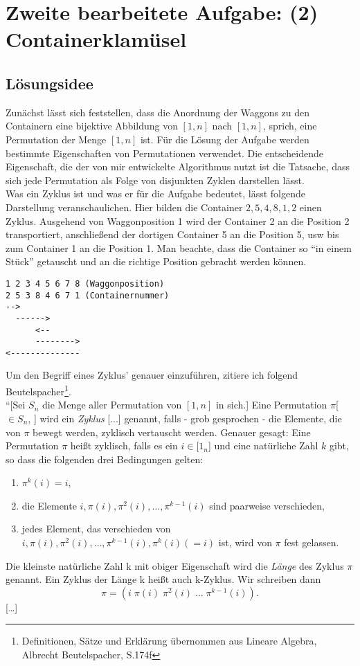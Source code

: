 \lstset{language=Scala}
\chapter{Zweite bearbeitete Aufgabe: (2) Containerklamüsel}
\minitoc
\clearpage
\section{Lösungsidee}
Zunächst lässt sich feststellen,
dass die Anordnung der Waggons zu den Containern eine bijektive Abbildung von $[1,n]$ nach $[1,n]$, sprich, eine Permutation der Menge $[1,n]$ ist.
Für die Lösung der Aufgabe werden bestimmte Eigenschaften von Permutationen verwendet. 
Die entscheidende Eigenschaft, die der von mir entwickelte Algorithmus nutzt ist die Tatsache,
dass sich jede Permutation als Folge von disjunkten Zyklen darstellen lässt.\\

Was ein Zyklus ist und was er für die Aufgabe bedeutet, lässt folgende Darstellung veranschaulichen.
Hier bilden die Container $2,5,4,8,1,2$ einen Zyklus. Ausgehend von Waggonposition 1 wird der Container 2 an die Position 2 transportiert,
anschließend der dortigen Container 5 an die Position 5, usw bis zum Container 1 an die Position 1.
Man beachte, dass die Container so ``in einem Stück'' getauscht und an die richtige Position gebracht werden können.
\lstset{basicstyle=\ttfamily}
\begin{lstlisting}
1 2 3 4 5 6 7 8 (Waggonposition)
2 5 3 8 4 6 7 1 (Containernummer)
-->
  ------>
      <--
      -------->
<--------------
\end{lstlisting}
\lstset{basicstyle=\ttfamily}
Um den Begriff eines Zyklus' genauer einzuführen, zitiere ich folgend Beutelspacher\footnote{Definitionen, Sätze und Erklärung übernommen aus Lineare Algebra, Albrecht Beutelspacher, S.174f}. \\

``[Sei $S_n$ die Menge aller Permutation von $[1,n]$ in sich.]
Eine Permutation $\pi$[$\in S_n$, ] wird ein \emph{Zyklus} [...] genannt, falls - grob gesprochen - die Elemente, die von $\pi$ bewegt werden,
zyklisch vertauscht werden. Genauer gesagt: Eine Permutation $\pi$ heißt zyklisch,
falls es ein $ i \in $[$1_n$] und eine natürliche Zahl $k$ gibt, so dass die folgenden drei Bedingungen gelten:
\begin{enumerate}
 \item $\pi^k(i) = i$,
 \item die Elemente $i,\pi(i),\pi^2(i),\dots,\pi^{k-1}(i)$ sind paarweise verschieden,
 \item jedes Element, das verschieden von $i,\pi(i),\pi^2(i),\dots,\pi^{k-1}(i), \pi^k(i) (=i)$ ist, wird von $\pi$ fest gelassen.
\end{enumerate}
Die kleinste natürliche Zahl k mit obiger Eigenschaft wird die \emph{Länge} des Zyklus $\pi$ genannt.
Ein Zyklus der Länge k heißt auch k-Zyklus. Wir schreiben dann \[\pi=(i\;\pi(i)\;\pi^2(i) \; \dots \;\pi^{k-1}(i)).\]
[\dots]
